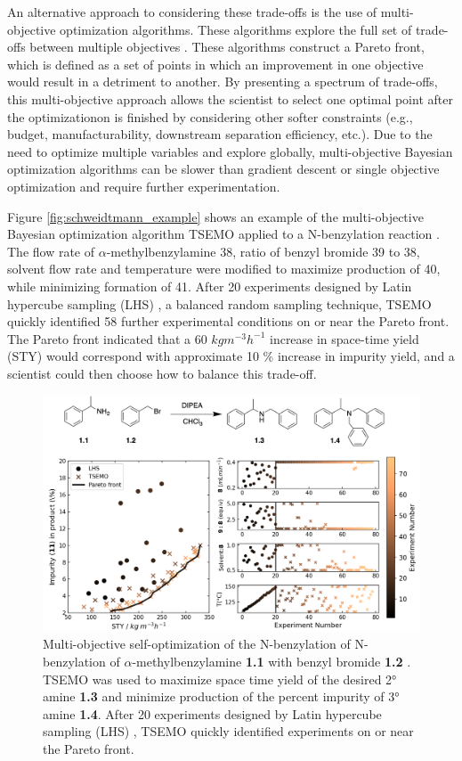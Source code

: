 An alternative approach to considering these trade-offs is the use of multi-objective optimization algorithms. These algorithms explore the full set of trade-offs between multiple objectives \cite{Bradford2018, Schweidtmann2018}. These algorithms construct a Pareto front, which is defined as a set of points in which an improvement in one objective would result in a detriment to another. By presenting a spectrum of trade-offs, this multi-objective approach allows the scientist to select one optimal point after the optimizationon is finished by considering other softer constraints (e.g., budget, manufacturability, downstream separation efficiency, etc.). Due to the need to optimize multiple variables and explore globally, multi-objective Bayesian optimization algorithms can be slower than gradient descent or single objective optimization and require further experimentation.

Figure \ref{fig:schweidtmann_example} shows an example of the multi-objective Bayesian optimization algorithm TSEMO \cite{Bradford2018} applied to a N-benzylation reaction \cite{Schweidtmann2018}. The flow rate of $\alpha$-methylbenzylamine 38, ratio of benzyl bromide 39 to 38, solvent flow rate and temperature were modified to maximize production of 40, while minimizing formation of 41. After 20 experiments designed by Latin hypercube sampling (LHS) \cite{McKay1979}, a balanced random sampling technique, TSEMO quickly identified 58 further experimental conditions on or near the Pareto front. The Pareto front indicated that a 60 $kg m^{-3} h^{-1}$ increase in space-time yield (STY) would correspond with approximate 10 \% increase in impurity yield, and a scientist could then choose how to balance this trade-off.

\begin{figure}
    \centering
    \includegraphics[width=\textwidth]{gfx/Chapter02/schweidtmann_thesis.png}
    \caption{Multi-objective self-optimization of the N-benzylation of N-benzylation of $\alpha$-methylbenzylamine \textbf{1.1} with benzyl bromide \textbf{1.2} \cite{Schweidtmann2018}. TSEMO \cite{Bradford2018} was used to maximize space time yield of the desired 2° amine \textbf{1.3} and minimize production of the percent impurity of 3° amine \textbf{1.4}. After 20 experiments designed by Latin hypercube sampling (LHS) \cite{McKay1979}, TSEMO quickly identified experiments on or near the Pareto front.}
    \label{fig:schweidtmann}
\end{figure}


